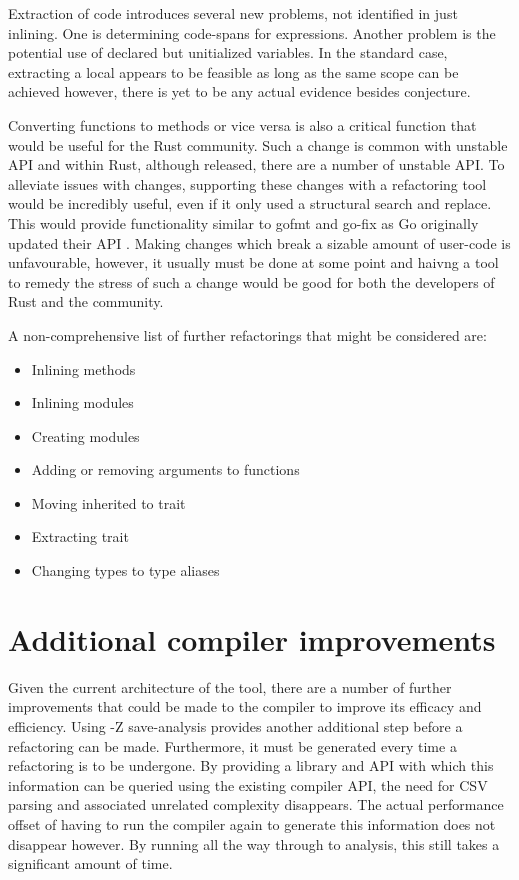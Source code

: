 Extraction of code introduces several new problems, not identified in just inlining. One is determining code-spans for expressions. Another problem is the potential use of declared but unitialized variables. In the standard case, extracting a local appears to be feasible as long as the same scope can be achieved however, there is yet to be any actual evidence besides conjecture.


Converting functions to methods or vice versa is also a critical function that would be useful for the Rust community. Such a change is common with unstable API and within Rust, although released, there are a number of unstable API. To alleviate issues with changes, supporting these changes with a refactoring tool would be incredibly useful, even if it only used a structural search and replace. This would provide functionality similar to gofmt and go-fix as Go originally updated their API \cite{gofix11}. Making changes which break a sizable amount of user-code is unfavourable, however, it usually must be done at some point and haivng a tool to remedy the stress of such a change would be good for both the developers of Rust and the community.

\noindent
A non-comprehensive list of further refactorings that might be considered are:
\begin{itemize}
\item Inlining methods
\item Inlining modules
\item Creating modules
\item Adding or removing arguments to functions
\item Moving inherited to trait
\item Extracting trait
\item Changing types to type aliases
\end{itemize}


\section{Additional compiler improvements}
Given the current architecture of the tool, there are a number of further improvements that could be made to the compiler to improve its efficacy and efficiency. Using -Z save-analysis provides another additional step before a refactoring can be made. Furthermore, it must be generated every time a refactoring is to be undergone. By providing a library and API with which this information can be queried using the existing compiler API, the need for CSV parsing and associated unrelated complexity disappears. The actual performance offset of having to run the compiler again to generate this information does not disappear however.  By running all the way through to analysis, this still takes a significant amount of time. 

